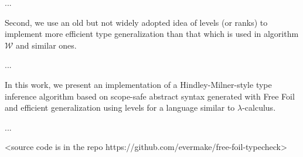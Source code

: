 ...

Second, we use an old but not widely adopted idea of levels (or ranks) to implement more efficient type generalization than that which is used in algorithm $\mathcal{W}$ and similar ones. 

...

In this work, we present an implementation of a Hindley-Milner-style type inference algorithm based on scope-safe abstract syntax generated with Free Foil and efficient generalization using levels for a language similar to $\lambda$-calculus.

...

<source code is in the repo https://github.com/evermake/free-foil-typecheck>
